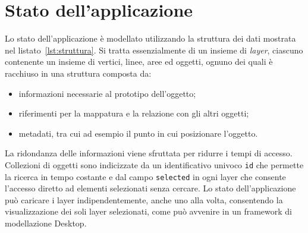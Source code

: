 \section{Stato dell'applicazione}
\label{sec:chapter_2_section_4}

Lo stato dell'applicazione è modellato utilizzando la struttura dei dati mostrata nel listato~\ref{lst:struttura}.
Si tratta essenzialmente di un insieme di \emph{layer}, ciascuno contenente un insieme di vertici, linee, aree
ed oggetti, ognuno dei quali è racchiuso in una struttura composta da:
\begin{itemize}
\item informazioni necessarie al prototipo dell'oggetto;
\item riferimenti per la mappatura e la relazione con gli altri oggetti;
\item metadati, tra cui ad esempio il punto in cui posizionare l'oggetto.
\end{itemize}

La ridondanza delle informazioni viene sfruttata per ridurre i tempi di accesso. Collezioni di oggetti
sono indicizzate da un identificativo univoco \texttt{id} che permette la ricerca in tempo costante e dal
campo \texttt{selected} in ogni layer che consente l'accesso diretto ad elementi selezionati senza cercare.
Lo stato dell'applicazione può caricare i layer indipendentemente, anche uno alla volta, consentendo
la visualizzazione dei soli layer selezionati, come può avvenire in un framework di modellazione Desktop.\\

\newpage



